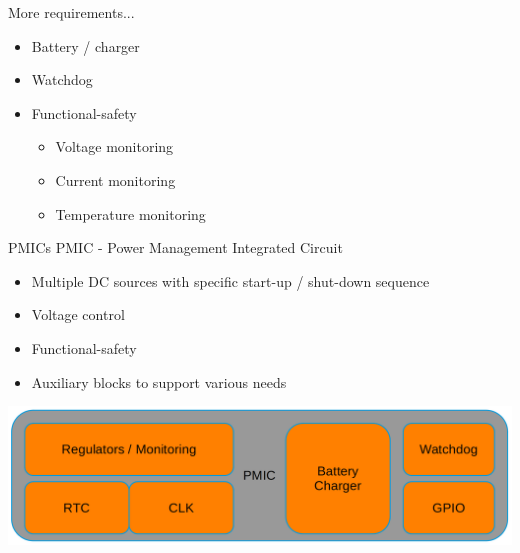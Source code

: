 \documentclass[10pt]{beamer}
\begin{document}
\begin{frame}{More requirements...}
\begin{itemize}
	\item Battery / charger
	\item Watchdog
	\item Functional-safety
	\begin{itemize}
		\item Voltage monitoring
		\item Current monitoring
		\item Temperature monitoring
	\end{itemize}
\end{itemize}
\end{frame}

\begin{frame}{PMICs}
PMIC - Power Management Integrated Circuit
\begin{itemize}
	\item Multiple DC sources with specific start-up / shut-down sequence
	\item Voltage control
	\item Functional-safety
	\item Auxiliary blocks to support various needs\\ [10pt]
\end{itemize}

\includegraphics[width=1\linewidth]{pmic_block.png}
\end{frame}
\end{document}
